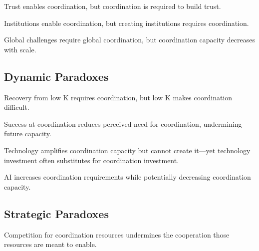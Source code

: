 \documentclass[12pt,letterpaper]{article}
\begin{document}
\begin{theorembox}
Trust enables coordination, but coordination is required to build trust.
\end{theorembox}

\begin{theorembox}
Institutions enable coordination, but creating institutions requires coordination.
\end{theorembox}

\begin{theorembox}
Global challenges require global coordination, but coordination capacity decreases with scale.
\end{theorembox}

\subsection{Dynamic Paradoxes}

\begin{theorembox}
Recovery from low K requires coordination, but low K makes coordination difficult.
\end{theorembox}

\begin{theorembox}
Success at coordination reduces perceived need for coordination, undermining future capacity.
\end{theorembox}

\begin{theorembox}
Technology amplifies coordination capacity but cannot create it---yet technology investment often substitutes for coordination investment.
\end{theorembox}

\begin{theorembox}
AI increases coordination requirements while potentially decreasing coordination capacity.
\end{theorembox}

\subsection{Strategic Paradoxes}

\begin{theorembox}
Competition for coordination resources undermines the cooperation those resources are meant to enable.
\end{theorembox}
\end{document}
